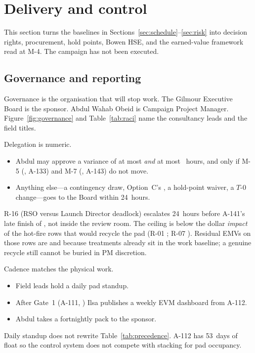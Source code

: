 \section{Delivery and control}
\label{sec:delivery}


This section turns the baselines in Sections~\ref{sec:schedule}--\ref{sec:risk} into decision rights, procurement, hold points, Bowen HSE, and the earned-value framework read at M-4. The campaign has not been executed.

\subsection{Governance and reporting}
\label{sec:delivery-governance}

Governance is the organisation that will stop work. The Gilmour Executive Board is the sponsor. Abdul Wahab Obeid is Campaign Project Manager. Figure~\ref{fig:governance} and Table~\ref{tab:raci} name the consultancy leads and the field titles.

Delegation is numeric.
\begin{itemize}[leftmargin=1.4em,itemsep=0.25em]
\item Abdul may approve a variance of at most \PEPdoaAud \emph{and} at most \PEPdoaHours~hours, and only if M-5 (\PEPmFiveLong, A-133) and M-7 (\PEPmSevenLong, A-143) do not move.
\item Anything else---a contingency draw, Option~C's \PEPoptionC, a hold-point waiver, a $T$-0 change---goes to the Board within 24~hours.
\end{itemize}
R-16 (RSO versus Launch Director deadlock) escalates 24~hours before A-141's late finish of \PEPmSixShort, not inside the review room. The \PEPdoaAud ceiling is below the dollar \emph{impact} of the hot-fire rows that would recycle the pad (R-01 \PEPrOiImpact; R-07 \PEPrViiImpact). Residual EMVs on those rows are \PEPrOiEmv and \PEPrViiEmv because treatments already sit in the work baseline; a genuine recycle still cannot be buried in PM discretion.

Cadence matches the physical work.
\begin{itemize}[leftmargin=1.4em,itemsep=0.25em]
\item Field leads hold a daily pad standup.
\item After Gate~1 (A-111, \PEPmTwoShort) Ilsa publishes a weekly EVM dashboard from A-112.
\item Abdul takes a fortnightly pack to the sponsor.
\end{itemize}
Daily standup does not rewrite Table~\ref{tab:precedence}. A-112 has 53~days of float so the control system does not compete with stacking for pad occupancy.

